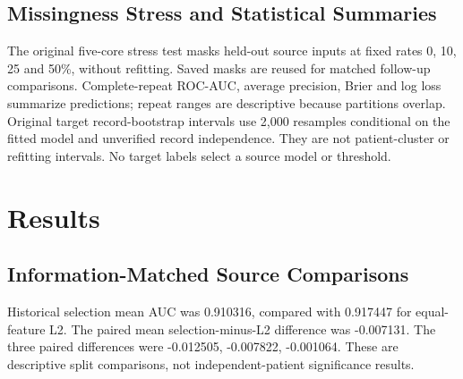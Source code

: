 \documentclass[conference,10pt]{IEEEtran}
\begin{document}
\subsection{Missingness Stress and Statistical Summaries}
The original five-core stress test masks held-out source inputs at fixed rates 0, 10, 25 and 50\%, without refitting. Saved masks are reused for matched follow-up comparisons. Complete-repeat ROC-AUC, average precision, Brier and log loss summarize predictions; repeat ranges are descriptive because partitions overlap. Original target record-bootstrap intervals use 2,000 resamples conditional on the fitted model and unverified record independence. They are not patient-cluster or refitting intervals. No target labels select a source model or threshold.

\section{Results}
\subsection{Information-Matched Source Comparisons}
Historical selection mean AUC was 0.910316, compared with 0.917447 for equal-feature L2. The paired mean selection-minus-L2 difference was -0.007131. The three paired differences were -0.012505, -0.007822, -0.001064. These are descriptive split comparisons, not independent-patient significance results.
\end{document}
